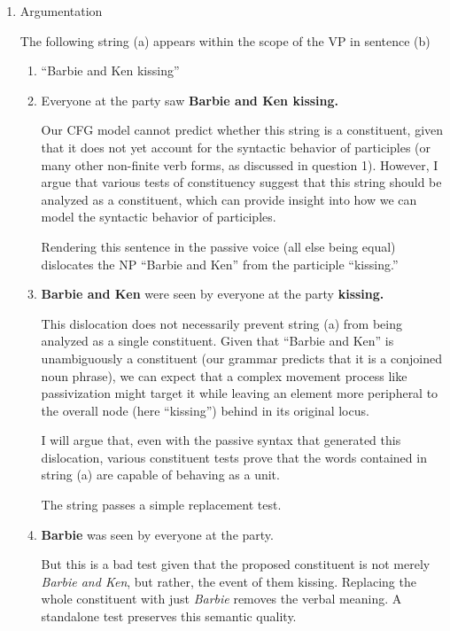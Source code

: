 \documentclass[12pt]{article}
\begin{document}
\begin{enumerate}
\begin{enumerate}
\begin{tikzpicture}
\end{tikzpicture}

\end{enumerate}

\item Argumentation

The following string (a) appears within the scope of the VP in sentence (b)

\begin{enumerate}
\item ``Barbie and Ken kissing''
\item Everyone at the party saw \textbf{Barbie and Ken kissing.}

Our CFG model cannot predict whether this string is a constituent, given that it does not yet account for the syntactic behavior of participles (or many other non-finite verb forms, as discussed in question 1). However, I argue that various tests of constituency suggest that this string should be analyzed as a constituent, which can provide insight into how we can model the syntactic behavior of participles.

Rendering this sentence in the passive voice (all else being equal) dislocates the NP ``Barbie and Ken'' from the participle ``kissing.''

\item \textbf{Barbie and Ken} were seen by everyone at the party \textbf{kissing.}

This dislocation does not necessarily prevent string (a) from being analyzed as a single constituent. Given that ``Barbie and Ken'' is unambiguously a constituent (our grammar predicts that it is a conjoined noun phrase), we can expect that a complex movement process like passivization might target it while leaving an element more peripheral to the overall node (here ``kissing'') behind in its original locus.

I will argue that, even with the passive syntax that generated this dislocation, various constituent tests prove that the words contained in string (a) are capable of behaving as a unit.

The string passes a simple replacement test.

\item \textbf{Barbie} was seen by everyone at the party.

But this is a bad test given that the proposed constituent is not merely \textit{Barbie and Ken}, but rather, the event of them kissing. Replacing the whole constituent with just \emph{Barbie} removes the verbal meaning. A standalone test preserves this semantic quality.


\end{enumerate}
\end{enumerate}
\end{document}
